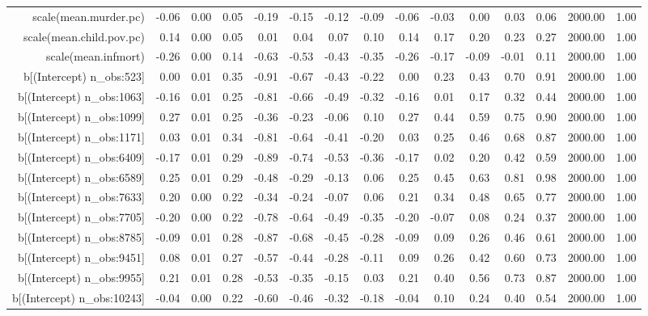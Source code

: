 \begin{table}[ht]
\begin{tabular}{rrrrrrrrrrrrrrr}
  scale(mean.murder.pc) & -0.06 & 0.00 & 0.05 & -0.19 & -0.15 & -0.12 & -0.09 & -0.06 & -0.03 & 0.00 & 0.03 & 0.06 & 2000.00 & 1.00 \\ 
  scale(mean.child.pov.pc) & 0.14 & 0.00 & 0.05 & 0.01 & 0.04 & 0.07 & 0.10 & 0.14 & 0.17 & 0.20 & 0.23 & 0.27 & 2000.00 & 1.00 \\ 
  scale(mean.infmort) & -0.26 & 0.00 & 0.14 & -0.63 & -0.53 & -0.43 & -0.35 & -0.26 & -0.17 & -0.09 & -0.01 & 0.11 & 2000.00 & 1.00 \\ 
  b[(Intercept) n\_obs:523] & 0.00 & 0.01 & 0.35 & -0.91 & -0.67 & -0.43 & -0.22 & 0.00 & 0.23 & 0.43 & 0.70 & 0.91 & 2000.00 & 1.00 \\ 
  b[(Intercept) n\_obs:1063] & -0.16 & 0.01 & 0.25 & -0.81 & -0.66 & -0.49 & -0.32 & -0.16 & 0.01 & 0.17 & 0.32 & 0.44 & 2000.00 & 1.00 \\ 
  b[(Intercept) n\_obs:1099] & 0.27 & 0.01 & 0.25 & -0.36 & -0.23 & -0.06 & 0.10 & 0.27 & 0.44 & 0.59 & 0.75 & 0.90 & 2000.00 & 1.00 \\ 
  b[(Intercept) n\_obs:1171] & 0.03 & 0.01 & 0.34 & -0.81 & -0.64 & -0.41 & -0.20 & 0.03 & 0.25 & 0.46 & 0.68 & 0.87 & 2000.00 & 1.00 \\ 
  b[(Intercept) n\_obs:6409] & -0.17 & 0.01 & 0.29 & -0.89 & -0.74 & -0.53 & -0.36 & -0.17 & 0.02 & 0.20 & 0.42 & 0.59 & 2000.00 & 1.00 \\ 
  b[(Intercept) n\_obs:6589] & 0.25 & 0.01 & 0.29 & -0.48 & -0.29 & -0.13 & 0.06 & 0.25 & 0.45 & 0.63 & 0.81 & 0.98 & 2000.00 & 1.00 \\ 
  b[(Intercept) n\_obs:7633] & 0.20 & 0.00 & 0.22 & -0.34 & -0.24 & -0.07 & 0.06 & 0.21 & 0.34 & 0.48 & 0.65 & 0.77 & 2000.00 & 1.00 \\ 
  b[(Intercept) n\_obs:7705] & -0.20 & 0.00 & 0.22 & -0.78 & -0.64 & -0.49 & -0.35 & -0.20 & -0.07 & 0.08 & 0.24 & 0.37 & 2000.00 & 1.00 \\ 
  b[(Intercept) n\_obs:8785] & -0.09 & 0.01 & 0.28 & -0.87 & -0.68 & -0.45 & -0.28 & -0.09 & 0.09 & 0.26 & 0.46 & 0.61 & 2000.00 & 1.00 \\ 
  b[(Intercept) n\_obs:9451] & 0.08 & 0.01 & 0.27 & -0.57 & -0.44 & -0.28 & -0.11 & 0.09 & 0.26 & 0.42 & 0.60 & 0.73 & 2000.00 & 1.00 \\ 
  b[(Intercept) n\_obs:9955] & 0.21 & 0.01 & 0.28 & -0.53 & -0.35 & -0.15 & 0.03 & 0.21 & 0.40 & 0.56 & 0.73 & 0.87 & 2000.00 & 1.00 \\ 
  b[(Intercept) n\_obs:10243] & -0.04 & 0.00 & 0.22 & -0.60 & -0.46 & -0.32 & -0.18 & -0.04 & 0.10 & 0.24 & 0.40 & 0.54 & 2000.00 & 1.00 \\ 

\end{tabular}
\end{table}
